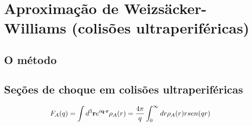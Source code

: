 \chapter{Aproximação de Weizsäcker-Williams (colisões ultraperiféricas)}
\label{cap4}
\section{O método}
\section{Seções de choque em colisões ultraperiféricas}
\begin{equation}
    F_A(q) = \int d^3\vb{r} e^{i\vb{q}\cdot \vb{r}} \rho_A(r) = \frac{4\pi}{q}\int^{\infty}_0 dr \rho_A(r) r sen(qr)
\end{equation}